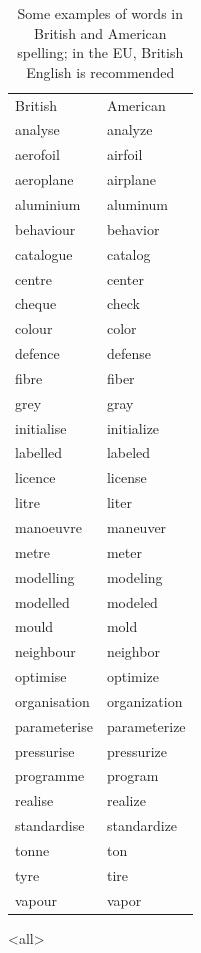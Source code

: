 \begin{table}\centering
	 \caption{Some examples of words in British and American spelling; in the EU, British English is recommended}\label{tab:english}
        \begin{tabular}{ll}
            \toprule
             British        & American\\[+1.5ex]
             analyse        & analyze\\
             aerofoil       & airfoil\\
             aeroplane      & airplane\\
             aluminium      & aluminum \\
             behaviour      & behavior\\
             catalogue      & catalog \\
             centre         & center\\
             cheque         & check \\
             colour         & color\\
             defence        & defense\\
             fibre          & fiber \\
             grey           & gray \\
             initialise     & initialize\\
             labelled       & labeled\\
             licence        & license \\
             litre          & liter\\
             manoeuvre      & maneuver \\
             metre          & meter\\
             modelling      & modeling\\
             modelled       & modeled\\
             mould          & mold\\
             neighbour      & neighbor\\
             optimise       & optimize\\
             organisation   & organization \\
             parameterise   & parameterize\\
             pressurise     & pressurize\\
             programme      & program\\
             realise        & realize\\
             standardise    & standardize\\
             tonne          & ton \\
             tyre           & tire\\
             vapour         & vapor\\
             \bottomrule
        \end{tabular}
\end{table}

\mode<all>












